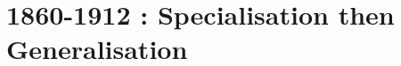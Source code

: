 \documentclass[a4paper, 12pt]{article}
\begin{document}




























\section{1860-1912 \CE: Specialisation then Generalisation }
\label{sec:reemerge:mpp}

\end{document}
